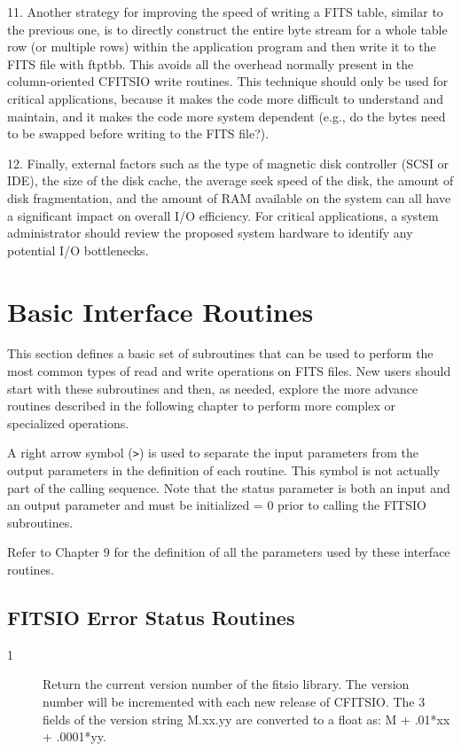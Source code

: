 \documentclass[11pt]{book}
\begin{document}
11. Another strategy for improving the speed of writing a FITS table,
similar to the previous one, is to directly construct the entire byte
stream for a whole table row (or multiple rows) within the application
program and then write it to the FITS file with
ftptbb.  This avoids all the overhead normally present
in the column-oriented CFITSIO write routines.  This technique should
only be used for critical applications, because it makes the code more
difficult to understand and maintain, and it makes the code more system
dependent (e.g., do the bytes need to be swapped before writing to the
FITS file?).

12.  Finally, external factors such as the type of magnetic disk
controller (SCSI or IDE), the size of the disk cache, the average seek
speed of the disk, the amount of disk fragmentation, and the amount of
RAM available on the system can all have a significant impact on
overall I/O efficiency.  For critical applications, a system
administrator should review the proposed system hardware to identify any
potential I/O bottlenecks.



\chapter{  Basic Interface Routines }

This section defines a basic set of subroutines that can be
used to perform the most common types of read and write operations
on FITS files.  New users should start with these subroutines and
then, as needed, explore the more advance routines described in
the following chapter to perform more complex or specialized operations.

A right arrow symbol (\verb+>+) is used to separate the input parameters from
the output parameters in the  definition of each routine.  This symbol
is not actually part of the calling sequence.  Note that
the status parameter is both an input and an output parameter
and must be initialized = 0 prior to calling the FITSIO subroutines.

Refer to Chapter 9 for the definition of all the parameters
used by these interface routines.


\section{FITSIO Error Status Routines \label{FTVERS}}


\begin{description}
\item[1 ] Return the current version number of the fitsio library.
    The version number will be incremented with each new
   release of CFITSIO. The 3 fields of the version string M.xx.yy
   are converted to a float as: M + .01*xx + .0001*yy.
\end{description}
\end{document}
